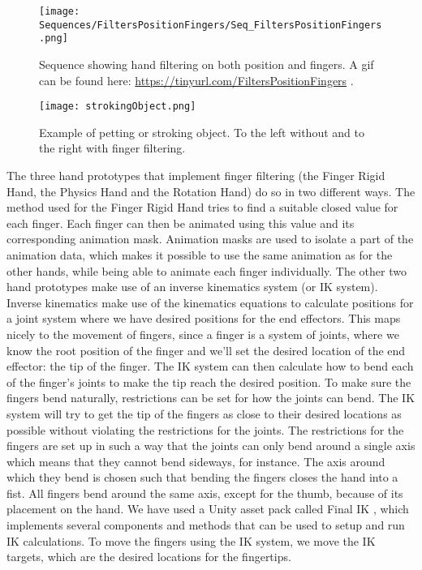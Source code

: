 \begin{figure}[H]
\centering
\texttt{[image: Sequences/FiltersPositionFingers/Seq\_FiltersPositionFingers.png]}
\caption{Sequence showing hand filtering on both position and fingers. A gif can be found here: \url{https://tinyurl.com/FiltersPositionFingers} .}
\label{fig:filtersPositionFingers}
\end{figure}

\begin{figure}[H]
\centering
\texttt{[image: strokingObject.png]}
\caption{Example of petting or stroking object. To the left without and to the right with finger filtering.}
\label{fig:strokingFingerExample}
\end{figure}

The three hand prototypes that implement finger filtering (the Finger Rigid Hand, the Physics Hand and the Rotation Hand) do so in two different ways. The method used for the Finger Rigid Hand tries to find a suitable closed value for each finger. Each finger can then be animated using this value and its corresponding animation mask. Animation masks are used to isolate a part of the animation data, which makes it possible to use the same animation as for the other hands, while being able to animate each finger individually. The other two hand prototypes make use of an inverse kinematics system (or IK system). Inverse kinematics make use of the kinematics equations to calculate positions for a joint system where we have desired positions for the end effectors. This maps nicely to the movement of fingers, since a finger is a system of joints, where we know the root position of the finger and we'll set the desired location of the end effector: the tip of the finger. The IK system can then calculate how to bend each of the finger's joints to make the tip reach the desired position. To make sure the fingers bend naturally, restrictions can be set for how the joints can bend. The IK system will try to get the tip of the fingers as close to their desired locations as possible without violating the restrictions for the joints. The restrictions for the fingers are set up in such a way that the joints can only bend around a single axis which means that they cannot bend sideways, for instance. The axis around which they bend is chosen such that bending the fingers closes the hand into a fist. All fingers bend around the same axis, except for the thumb, because of its placement on the hand. We have used a Unity asset pack called Final IK \parencite{RootMotion2017}, which implements several components and methods that can be used to setup and run IK calculations. To move the fingers using the IK system, we move the IK targets, which are the desired locations for the fingertips.

